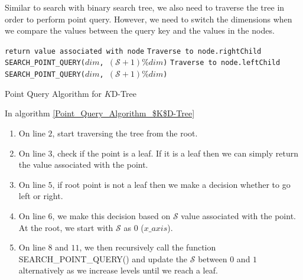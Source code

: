 Similar to search with binary search tree, we also need to traverse the tree in order to perform point query. However, we need to switch the dimensions when we compare the values between the query key and the values in the nodes.

\begin{algorithm}[H]
    \SetAlgoLined
        {
            \texttt{return value associated with node}
        }
        {
            {\texttt{Traverse to node.rightChild}\\ \texttt{SEARCH\_POINT\_QUERY($dim$, $(\mathcal{S}+1) \% dim$)}}
        {\texttt{Traverse to node.leftChild}\\ 
        \texttt{SEARCH\_POINT\_QUERY($dim$, $(\mathcal{S}+1) \% dim$)}}
        }
    \caption{Point Query Algorithm for $K$D-Tree}
    \label{algo: point_query_kdtree}
\end{algorithm}

In algorithm \ref{Point_Query_Algorithm_$K$D-Tree} 

\begin{enumerate}

    \item On line $2$, start traversing the tree from the root. 
    
    \item On line $3$, check if the point is a leaf. If it is a leaf then we can simply return the value associated with the point.
    
    \item On line $5$, if root point is not a leaf then we make a decision whether to go left or right.
    
    \item On line $6$, we make this decision based on $\mathcal{S}$ value associated with the point. At the root, we start with $\mathcal{S}$ as $0$ ($x\_axis$). 
    \item On line $8$ and $11$, we then recursively call the function SEARCH\_POINT\_QUERY() and update the $\mathcal{S}$ between $0$ and $1$ alternatively as we increase levels until we reach a leaf.

\end{enumerate}

